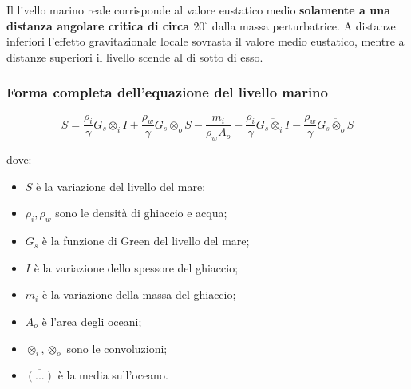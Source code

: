 \documentclass[a4paper,12pt]{book}
\begin{document}
\noindent
Il livello marino reale corrisponde al valore eustatico medio \textbf{solamente a una distanza angolare critica di circa $20^\circ$} dalla massa perturbatrice. A distanze inferiori l'effetto gravitazionale locale sovrasta il valore medio eustatico, mentre a distanze superiori il livello scende al di sotto di esso.

\subsubsection{\textcolor{colore7}{Forma completa dell'equazione del livello marino}}

\begin{equation}
    S = \frac{\rho_i}{\gamma} G_s \otimes_iI + \frac{\rho_w}{\gamma} G_s \otimes_o S - \frac{m_i}{\rho_w A_o} - \frac{\rho_i}{\gamma} \overline{G_s \otimes_iI} - \frac{\rho_w}{\gamma} \overline{G_s \otimes_oS}
\end{equation}

\noindent
dove:

\begin{itemize}
    \item $S$ è la variazione del livello del mare;
    \item $\rho_i, \rho_w$ sono le densità di ghiaccio e acqua;
    \item $G_s$ è la funzione di Green del livello del mare;
    \item $I$ è la variazione dello spessore del ghiaccio;
    \item $m_i$ è la variazione della massa del ghiaccio;
    \item $A_o$ è l'area degli oceani;
    \item $\otimes_i, \otimes_o$ sono le convoluzioni;
    \item $\overline{(...)}$ è la media sull'oceano.
\end{itemize}
\end{document}
